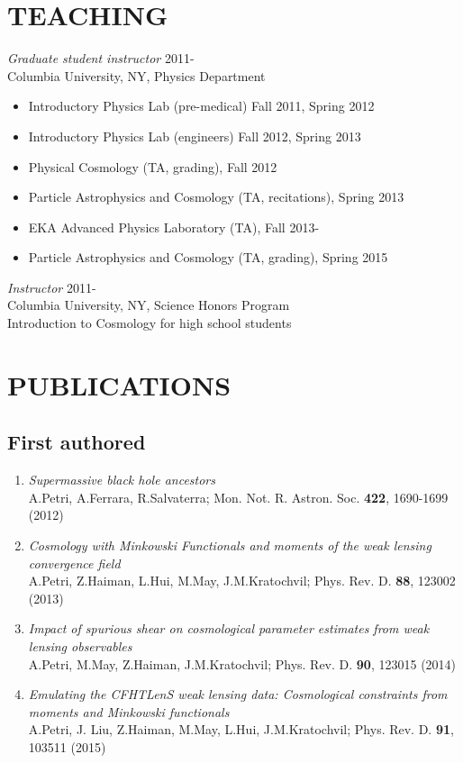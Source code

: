 \documentclass[margin, 10pt]{res} %
\begin{document}
\begin{resume}
\section{TEACHING} 
{\sl Graduate student instructor} \hfill 2011-\\ 
Columbia University, NY, Physics Department 
\begin{itemize}
\item Introductory Physics Lab (pre-medical) Fall 2011, Spring 2012
\item Introductory Physics Lab (engineers) Fall 2012, Spring 2013
\item Physical Cosmology (TA, grading), Fall 2012
\item Particle Astrophysics and Cosmology (TA, recitations), Spring 2013 
\item EKA Advanced Physics Laboratory (TA), Fall 2013-
\item Particle Astrophysics and Cosmology (TA, grading), Spring 2015
\end{itemize}

{\sl Instructor} \hfill 2011- \\
Columbia University, NY, Science Honors Program\\
Introduction to Cosmology for high school students

\section{PUBLICATIONS}

\subsection{First authored}

\begin{enumerate}
\item {\sl Supermassive black hole ancestors} \\
A.Petri, A.Ferrara, R.Salvaterra; Mon. Not. R. Astron. Soc. \textbf{422}, 1690-1699 (2012)
\item {\sl Cosmology with Minkowski Functionals and moments of the weak lensing convergence field} \\
A.Petri, Z.Haiman, L.Hui, M.May, J.M.Kratochvil; Phys. Rev. D. \textbf{88}, 123002 (2013)
\item {\sl Impact of spurious shear on cosmological parameter estimates from weak lensing observables} \\
A.Petri, M.May, Z.Haiman, J.M.Kratochvil; Phys. Rev. D. \textbf{90}, 123015 (2014)
\item {\sl Emulating the CFHTLenS weak lensing data: Cosmological constraints from moments and Minkowski functionals} \\
A.Petri, J. Liu, Z.Haiman, M.May, L.Hui, J.M.Kratochvil; Phys. Rev. D. \textbf{91}, 103511 (2015)
\end{enumerate}


\end{resume}
\end{document}
